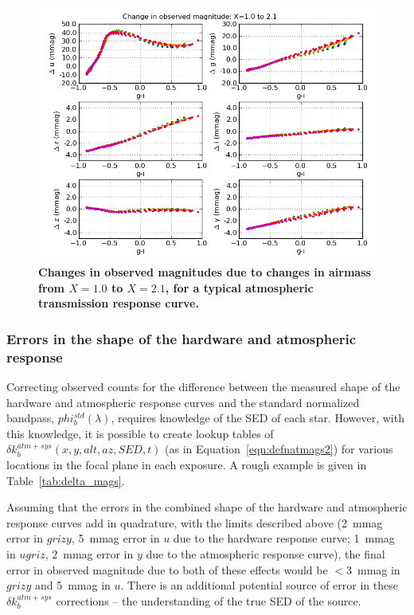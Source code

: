 \documentclass[12pt,preprint]{aastex}
\begin{document}
\begin{figure}
\centering
\includegraphics[width=6in]{delta_mags_airmass_big}
\caption{{\small
{\bf Changes in observed magnitudes due to changes in airmass from $X=1.0$ 
to $X=2.1$, for a typical atmospheric transmission response curve.}
}}
\label{fig:dmag_airmass}
\end{figure}


\subsubsection{Errors in the shape of the hardware and atmospheric response}
\label{sec:apply_deltak}

Correcting observed counts for the difference between the measured
shape of the hardware and atmospheric response curves and the standard
normalized bandpass, $phi_b^{std}(\lambda)$, requires knowledge of the
SED of each star. However, with this knowledge, it is possible to
create lookup tables of $\delta k_b^{atm+sys}(x,y,alt,az,SED,t)$ (as
in Equation~\ref{eqn:defnatmags2}) for various locations in the focal
plane in each exposure. A rough example is given in
Table~\ref{tab:delta_mags}.

Assuming that the errors in the combined shape of the hardware and atmospheric
response curves add in quadrature, with the limits described above (2~mmag error
in $grizy$,  5~mmag error in $u$ due to the hardware response curve; 
1~mmag in $ugriz$, 2~mmag error in $y$ due to the atmospheric response curve), 
the final error in observed magnitude due to both of these effects would be $<3$~mmag
in $grizy$ and 5~mmag in $u$. There is an additional potential source of error in these
$\delta k_b^{atm+sys}$ corrections -- the understanding of the true SED of the 
source. 
\end{document}
